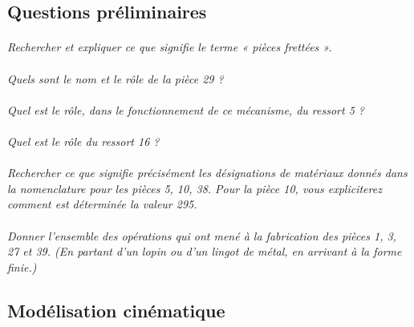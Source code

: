 \documentclass[11pt,oneside]{article}
\begin{document}
\subsection{Questions préliminaires}
\paragraph{}
\textit{Rechercher et expliquer ce que signifie le terme « pièces frettées ».}


\paragraph{}
\textit{Quels sont le nom et le rôle de la pièce 29 ?}

\paragraph{}
\textit{Quel est le rôle, dans le fonctionnement de ce mécanisme, du ressort 5 ?}

\paragraph{}
\textit{Quel est le rôle du ressort 16 ?}

\paragraph{}
\textit{Rechercher ce que signifie précisément les désignations de matériaux donnés dans la nomenclature pour les pièces 5, 10, 38. Pour la pièce 10, vous expliciterez comment est déterminée la valeur 295. }

\paragraph{}
\textit{Donner l'ensemble des opérations qui ont mené à la fabrication des pièces 1, 3, 27 et 39. (En partant d'un lopin ou d'un lingot de métal, en arrivant à la forme finie.)}



\subsection{Modélisation cinématique}
\end{document}
